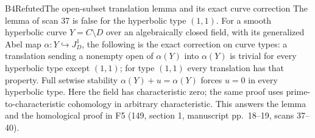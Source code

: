 \begin{result}{B4}{Refuted}{The open-subset translation lemma and its exact curve correction}
\label{res:B4}
The lemma of scan 37 is false for the hyperbolic type $(1,1)$.
For a smooth hyperbolic curve $Y=C\setminus D$ over an algebraically
closed field, with its generalized Abel map $\alpha:Y\hookrightarrow J_D^1$,
the following is the exact correction on curve types: a translation
sending a nonempty open of $\alpha(Y)$ into $\alpha(Y)$ is trivial for
every hyperbolic type except $(1,1)$; for type $(1,1)$ every translation
has that property. Full setwise stability $\alpha(Y)+u=\alpha(Y)$ forces
$u=0$ in every hyperbolic type. Here the field has characteristic zero;
the same proof uses prime-to-characteristic cohomology in arbitrary
characteristic. This answers the lemma and the homological proof in F5
(149, section 1, manuscript pp.~18--19, scans 37--40).
\end{result}

